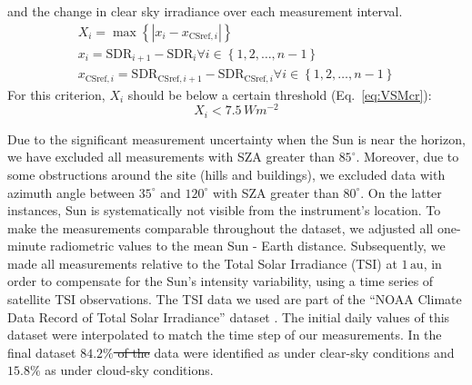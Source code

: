 \documentclass[applsci,article,submit,moreauthors,pdftex]{Definitions/mdpi}
\providecommand{\DIFadd}[1]{{\protect\color{blue}\uwave{#1}}} %
\providecommand{\DIFdel}[1]{{\protect\color{red}\sout{#1}}}                      %
\providecommand{\DIFaddbegin}{} %
\providecommand{\DIFaddend}{} %
\providecommand{\DIFdelbegin}{} %
\providecommand{\DIFdelend}{} %
\begin{document}
\begin{enumerate}
  and the change in clear sky irradiance over each measurement interval.
  \begin{gather}
    X_i = \max{\left \{ \left | x_i - x_{\text{CSref},i} \right | \right \}} \label{eq:VSM3} \\
    x_i = \text{SDR}_{i+1} - \text{SDR}_{i} \forall i \in \left \{ 1, 2, \ldots, n-1 \right \} \label{eq:VSM1} \\
    x_{\text{CSref},i} = \text{SDR}_{\text{CSref},i+1} - \text{SDR}_{\text{CSref},i} \forall i \in \left \{ 1, 2, \ldots, n-1 \right \} \label{eq:VSM2}
  \end{gather} For this criterion, \(X_i\) should be below a certain
  threshold (Eq.~\ref{eq:VSMcr}): \begin{equation}
    X_i < 7.5\,Wm^{-2} \label{eq:VSMcr}
  \end{equation}
\end{enumerate}

Due to the significant measurement uncertainty when the Sun is near the
horizon, we have excluded all measurements with SZA greater than
\(85^\circ\). Moreover, due to some obstructions around the site (hills
and buildings), we excluded data with azimuth angle between \DIFdelbegin \DIFdel{\(35^\circ\)
}\DIFdelend \DIFaddbegin \DIFadd{\(58^\circ\)
}\DIFaddend and \(120^\circ\) with SZA greater than \DIFdelbegin \DIFdel{\(80^\circ\)}\DIFdelend \DIFaddbegin \DIFadd{\(78^\circ\)}\DIFaddend . On the latter
instances, Sun is systematically not visible from the instrument's
location. To make the measurements comparable throughout the dataset, we
adjusted all one-minute radiometric values to the mean Sun - Earth
distance. Subsequently, we made all measurements relative to the Total
Solar Irradiance (TSI) at \(1\,\text{au}\), in order to compensate for
the Sun's intensity variability, using a time series of satellite TSI
observations. The TSI data we used are part of the ``NOAA Climate Data
Record of Total Solar Irradiance'' dataset \citep{Coddington2005}. The
initial daily values of this dataset were interpolated to match the time
step of our measurements. In the final dataset \DIFdelbegin \DIFdel{\(84.2\%\) of the
}\DIFdelend \DIFaddbegin \DIFadd{\(23.3\%\) of the
1-minute }\DIFaddend data were identified as under clear-sky conditions and
\DIFdelbegin \DIFdel{\(15.8\%\) }\DIFdelend \DIFaddbegin \DIFadd{\(40.7\%\) }\DIFaddend as under cloud-sky conditions.
\end{document}
